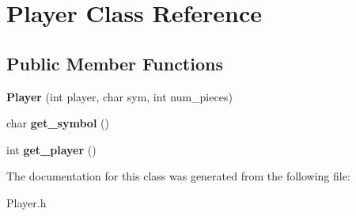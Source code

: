 \hypertarget{class_player}{}\section{Player Class Reference}
\label{class_player}
\subsection*{Public Member Functions}
\begin{DoxyCompactItemize}
\item 
\mbox{\label{class_player_adb32329b21de2fca0d7b8caa3e4562ba}} 
{\bfseries Player} (int player, char sym, int num\+\_\+pieces)
\item 
\mbox{\label{class_player_a063ffb27c65cd9e391bdc4024b47c579}} 
char {\bfseries get\+\_\+symbol} ()
\item 
\mbox{\label{class_player_a01e4f35c585d5894021ee15363af0b72}} 
int {\bfseries get\+\_\+player} ()
\end{DoxyCompactItemize}


The documentation for this class was generated from the following file\+:\begin{DoxyCompactItemize}
\item 
Player.\+h\end{DoxyCompactItemize}
